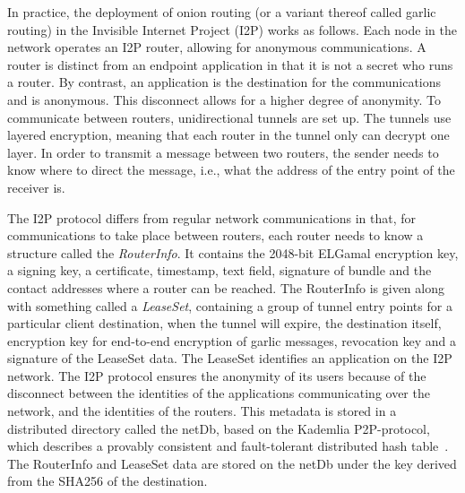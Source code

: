 In practice, the deployment of onion routing (or a variant thereof called garlic routing) in the Invisible Internet Project (I2P) works as follows. Each node in the network operates an I2P router, allowing for anonymous communications. A router is distinct from an endpoint application in that it is not a secret who runs a router. By contrast, an application is the destination for the communications and is anonymous.  This disconnect allows for a higher degree of anonymity. To communicate between routers, unidirectional tunnels are set up. The tunnels use layered encryption, meaning that each router in the tunnel only can decrypt one layer. In order to transmit a message between two routers, the sender needs to know  where to direct the message, i.e., what the address of the entry point of the receiver is. 

The I2P protocol differs from regular network communications in that, for communications to take place between routers, each router needs to know a structure called the \textit{RouterInfo}. It contains the 2048-bit ELGamal encryption key, a signing key, a certificate, timestamp, text field, signature of bundle and the contact addresses where a router can be reached. The RouterInfo is given along with something called a \textit{LeaseSet}, containing a group of tunnel entry points for a particular client destination, when the tunnel will expire, the destination itself, encryption key for end-to-end encryption of garlic messages, revocation key and a signature of the LeaseSet data. The LeaseSet identifies an application on the I2P network. The I2P protocol ensures the anonymity of its users because of the disconnect between the identities of the applications communicating over the network, and the identities of the routers. This metadata is stored in a distributed directory called the netDb, based on the Kademlia P2P-protocol, which describes a provably consistent and fault-tolerant distributed hash table~\cite{kademlia}. The RouterInfo and LeaseSet data are stored on the netDb under the key derived from the SHA256 of the destination.


